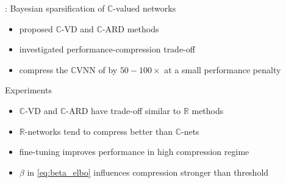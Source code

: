 \documentclass{beamer}
\newcommand{\real}{\mathbb{R}}
\newcommand{\cplx}{\mathbb{C}}
\begin{document}
\begin{frame}[c]{\insertsection: \insertsubsection}
  Bayesian sparsification of $\cplx$-valued networks
  \begin{itemize}
    \item proposed $\cplx$-VD and $\cplx$-ARD methods
    \item investigated performance-compression trade-off
    \item compress the $\cplx$VNN of \citet{trabelsi_deep_2018}
    by $50-100\times$ at a small performance penalty
  \end{itemize}

  \pause
  \medskip
  Experiments
  \begin{itemize}
    \item $\cplx$-VD and $\cplx$-ARD have trade-off similar to $\real$ methods
    \smallskip
    \item $\real$-networks tend to compress better than $\cplx$-nets
    \smallskip
    \item fine-tuning improves performance in high compression regime
    \smallskip
    \item $\beta$ in \ref{eq:beta_elbo} influences compression stronger than threshold
  \end{itemize}


\end{frame}
\end{document}

